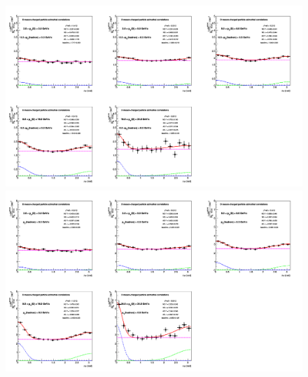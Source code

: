\begin{figure}[h]
\centering
{\includegraphics[width=0.99\linewidth, height=0.70\linewidth]{figures/Fits/cFitting_0_pthad0dot3to1dot.png}}
{\includegraphics[width=0.99\linewidth, height=0.70\linewidth]{figures/Fits/cFitting_0_pthad0dot3to99dot0.png}}
\end{figure}
